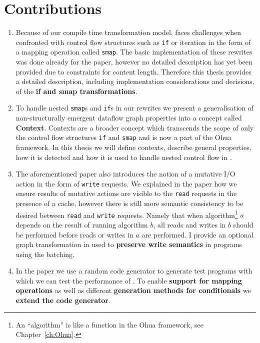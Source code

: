 \section{Contributions}

\begin{enumerate}
    \item Because of our compile time transformation model, \yauhau{} faces challenges when confronted with control flow structures such as \texttt{if} or iteration in the form of a mapping operation called \texttt{smap}.
    The basic implementation of these rewrites was done already for the paper, however no detailed description has yet been provided due to constraints for content length.
    Therefore this thesis provides a detailed description, including implementation considerations and decisions, of the \textbf{if and smap transformations}.
    \item To handle nested \texttt{smap}s and \texttt{if}s in our rewrites we present a generalisation of non-structurally emergent dataflow graph properties into a concept called \textbf{Context}.
    Contexts are a broader concept which transcends the scope of only the control flow structures \texttt{if} and \texttt{smap} and is now a part of the Ohua framework.
    In this thesis we will define contexts, describe general properties, how it is detected and how it is used to handle nested control flow in \yauhau{}.
    \item The aforementioned paper also introduces the notion of a mutative I/O action in the form of \texttt{write} requests.
    We explained in the paper how we ensure results of mutative actions are visible to the \texttt{read} requests in the presence of a cache, however there is still more semantic consistency to be desired between \texttt{read} and \texttt{write} requests.
    Namely that when algorithm\footnote{An ``algorithm'' is like a function in the Ohua framework, see Chapter~\ref{ch:Ohua}.} $a$ depends on the result of running algorithm $b$, all reads and writes in $b$ should be performed before reads or writes in $a$ are performed.
    I provide an optional graph transformation in \yauhau{} used to \textbf{preserve write semantics} in programs using the \yauhau{} batching.
    \item In the \yauhau{} paper we use a random code generator to generate test programs with which we can test the performance of \yauhau{}.
    To enable \textbf{support for mapping operations} as well as different \textbf{generation methods for conditionals} we \textbf{extend the code generator}.

\end{enumerate}
